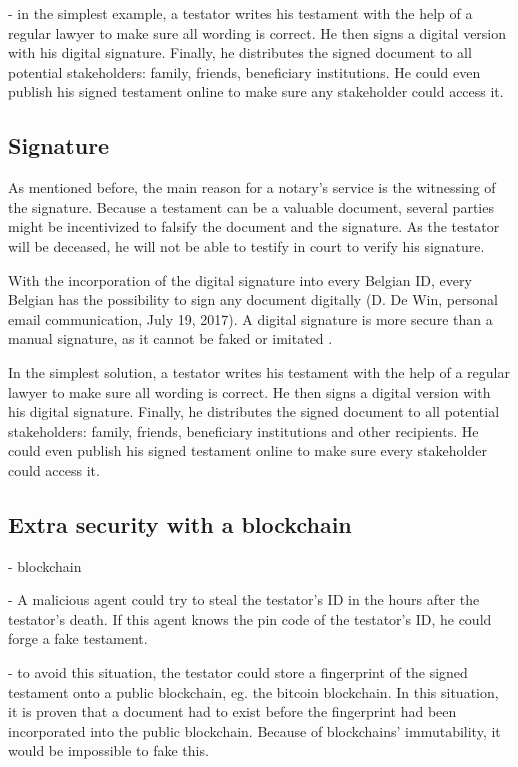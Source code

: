 - in the simplest example, a testator writes his testament with the help of a regular lawyer to make sure all wording is correct. He then signs a digital version with his digital signature. Finally, he distributes the signed document to all potential stakeholders: family, friends, beneficiary institutions. He could even publish his signed testament online to make sure any stakeholder could access it.
\fi

\subsection{Signature}

 As mentioned before, the main reason for a notary's service is the witnessing of the signature. Because a testament can be a valuable document, several parties might be incentivized to falsify the document and the signature. As the testator will be deceased, he will not be able to testify in court to verify his signature.

 With the incorporation of the digital signature into every Belgian ID, every Belgian has the possibility to sign any document digitally (D. De Win, personal email communication, July 19, 2017). A digital signature is more secure than a manual signature, as it cannot be faked or imitated \cite{belgian-eid}. 

 In the simplest solution, a testator writes his testament with the help of a regular lawyer to make sure all wording is correct. He then signs a digital version with his digital signature. Finally, he distributes the signed document to all potential stakeholders: family, friends, beneficiary institutions and other recipients. He could even publish his signed testament online to make sure every stakeholder could access it.


\subsection{Extra security with a blockchain}

\iffalse
- blockchain

- A malicious agent could try to steal the testator's ID in the hours after the testator's death. If this agent knows the pin code of the testator's ID, he could forge a fake testament.

- to avoid this situation, the testator could store a fingerprint of the signed testament onto a public blockchain, eg. the bitcoin blockchain. In this situation, it is proven that a document had to exist before the fingerprint had been incorporated into the public blockchain. Because of blockchains' immutability, it would be impossible to fake this.

